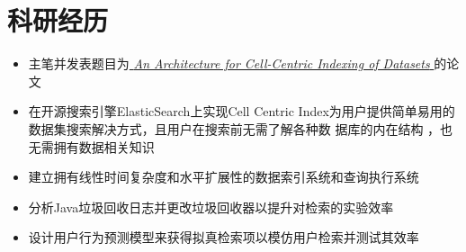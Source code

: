 \documentclass{resume}
\begin{document}
\vspace{-6pt}

\section{科研经历}
\begin{itemize}
  \item 主笔并发表题目为\href{http://ceur-ws.org/Vol-2722/profiles2020-paper-2.pdf}{ \textit{An Architecture for Cell-Centric Indexing of Datasets }}的论文
  \item 在开源搜索引擎ElasticSearch上实现Cell Centric Index为用户提供简单易用的数据集搜索解决方式，且用户在搜索前无需了解各种数 据库的内在结构 ，也无需拥有数据相关知识
  \item 建立拥有线性时间复杂度和水平扩展性的数据索引系统和查询执行系统
  \item 分析Java垃圾回收日志并更改垃圾回收器以提升对检索的实验效率
  \item 设计用户行为预测模型来获得拟真检索项以模仿用户检索并测试其效率
\end{itemize}
\vspace{-10pt}
\end{document}
